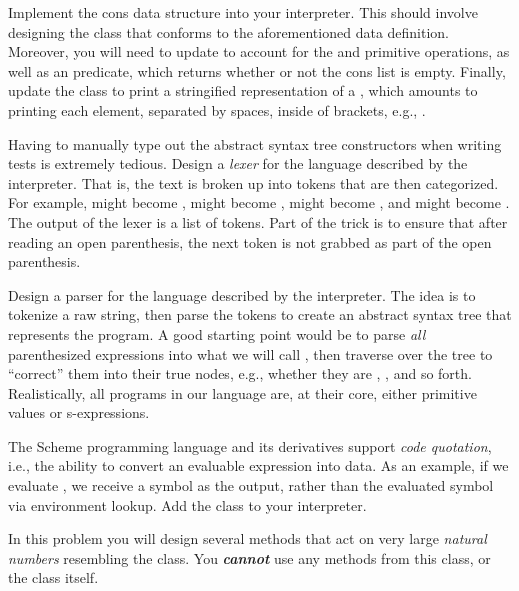 Implement the cons data structure into your interpreter. This should involve designing the  class that conforms to the aforementioned data definition. Moreover, you will need to update  to account for the  and  primitive operations, as well as an  predicate, which returns whether or not the cons list is empty. Finally, update the  class to print a stringified representation of a , which amounts to printing each element, separated by spaces, inside of brackets, e.g., \ttt{[$l_0, l_1, ..., l_{n-1}]$}.

Having to manually type out the abstract syntax tree constructors when writing tests is extremely tedious. Design a \textit{lexer} for the language described by the interpreter. That is, the text is broken up into tokens that are then categorized. For example,  might become ,  might become ,  might become , and  might become . The output of the lexer is a list of tokens. Part of the trick is to ensure that after reading an open parenthesis, the next token is not grabbed as part of the open parenthesis.

Design a parser for the language described by the interpreter. The idea is to tokenize a raw string, then parse the tokens to create an abstract syntax tree that represents the program. A good starting point would be to parse \textit{all} parenthesized expressions into what we will call , then traverse over the tree to ``correct'' them into their true nodes, e.g., whether they are , , and so forth. Realistically, all programs in our language are, at their core, either primitive values or s-expressions.

The Scheme programming language and its derivatives support \textit{code quotation}, i.e., the ability to convert an evaluable expression into data. As an example, if we evaluate , we receive a symbol as the output, rather than the evaluated symbol via environment lookup. Add the  class to your interpreter.

In this problem you will design several methods that act on very large \textit{natural numbers} resembling the  class. You \textit{\textbf{cannot}} use any methods from this class, or the class itself. 

